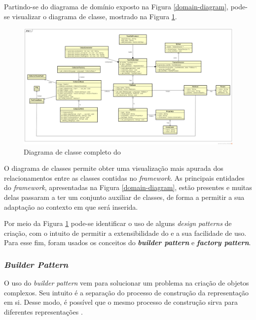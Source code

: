 Partindo-se do diagrama de domínio exposto na Figura \ref{domain-diagram}, pode-se
visualizar o diagrama de classe, mostrado na Figura \ref{class-diagram}.
\begin{figure}[h]
  \centering
    \includegraphics[width=\textwidth]{figuras/class-diagram.png}
    \caption{Diagrama de classe completo do \scarefault}
    \label{class-diagram}
\end{figure}
\FloatBarrier

O diagrama de classes permite obter uma visualização mais apurada dos
relacionamentos entre as classes contidas no \textit{framework}. As principais
entidades do \textit{framework}, apresentadas na Figura \ref{domain-diagram},
estão presentes e muitas delas passaram a ter um conjunto auxiliar de classes,
de forma a permitir a sua adaptação ao contexto em que será inserida.

Por meio da Figura \ref{class-diagram} pode-se identificar o uso de alguns
\textit{design patterns} de criação, com o intuito de permitir a
extensibilidade do \framework e a sua facilidade de uso. Para esse fim,
foram usados os conceitos do \textbf{\textit{builder pattern}} e
\textbf{\textit{factory pattern}}.

\subsubsection{\textit{Builder Pattern}}
O uso do \textit{builder pattern} vem para solucionar um problema
na criação de objetos complexos. Seu intuito é a separação do processo
de construção da representação em si. Desse modo, é possível que o
mesmo processo de construção sirva para diferentes representações
\cite{gammaEtAl1994}.

